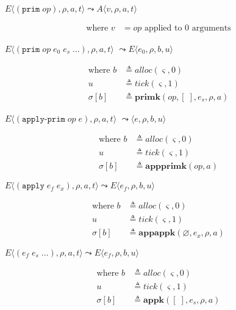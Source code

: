 \documentclass[12pt,draft]{article}
\newcommand{\primsyn}[2]{(\texttt{prim}\;#1\;#2\;...)}
\newcommand{\singleprimsyn}[1]{(\texttt{prim}\;#1)}
\newcommand{\applyprimsyn}[2]{(\texttt{apply-prim}\;#1\;#2)}
\newcommand{\applysyn}[2]{(\texttt{apply}\;#1\;#2)}
\begin{document}
\begin{multicols*}{2}
\begin{center}
  $E\langle \singleprimsyn{op} , \rho , a , t \rangle
  \leadsto
  A\langle v , \rho , a , t \rangle$
\end{center}
\vspace{-7mm}
\begin{align*}
\text{where } v &= op \text{ applied to } 0 \text{ arguments}
\end{align*}
\begin{center}
  $E\langle \primsyn{op}{e_0\;e_s} , \rho , a , t \rangle$
  $\leadsto E\langle e_0 , \rho , b , u \rangle$
\end{center}
\vspace{-7mm}
\begin{align*}
\text{where } b &\triangleq alloc(\varsigma, 0) \\
u &\triangleq tick(\varsigma, 1) \\
\sigma[b] &\triangleq \textbf{primk}(op, [\;], e_s, \rho, a)
\end{align*}
\begin{center}
  $E\langle \applyprimsyn{op}{e} , \rho , a , t \rangle$
  $\leadsto \langle e , \rho , b , u \rangle$
\end{center}
\vspace{-7mm}
\begin{align*}
\text{where } b &\triangleq alloc(\varsigma, 0) \\
u &\triangleq tick(\varsigma, 1) \\
\sigma[b] &\triangleq \textbf{appprimk}(op, a)
\end{align*}
\begin{center}
  $E\langle \applysyn{e_f}{e_x} , \rho , a , t \rangle
  \leadsto E\langle e_f , \rho , b , u \rangle$
\end{center}
\vspace{-7mm}
\begin{align*}
\text{where } b &\triangleq alloc(\varsigma, 0) \\
u &\triangleq tick(\varsigma, 1) \\
\sigma[b] &\triangleq \textbf{appappk}(\varnothing , e_x , \rho, a)
\end{align*}
\begin{center}
  $E\langle (e_f\;e_s\;...) , \rho , a , t \rangle
  \leadsto E\langle e_f , \rho , b , u \rangle$
\end{center}
\vspace{-7mm}
\begin{align*}
\text{where } b &\triangleq alloc(\varsigma, 0) \\
u &\triangleq tick(\varsigma, 1) \\
\sigma[b] &\triangleq \textbf{appk}([\;],  e_s , \rho, a)
\end{align*}
\end{multicols*}
\end{document}
